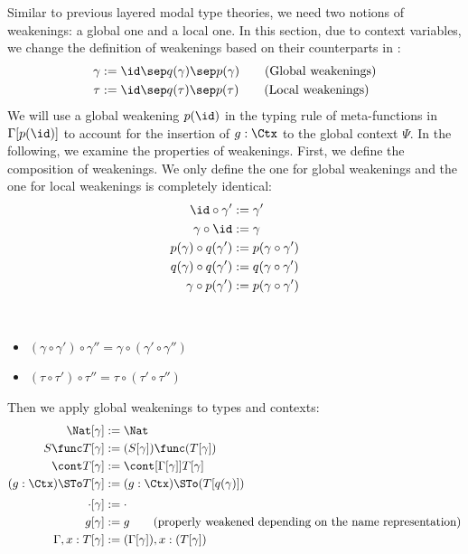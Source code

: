 Similar to previous layered modal type theories, we need two notions of weakenings: a global one and
a local one. %
In this section, due to context variables, we change the definition of weakenings
based on their counterparts in \citet{hu2024layered}:
\begin{align*}
  \gamma &:= \id \sep q(\gamma) \sep p(\gamma)
  \tag{Global weakenings}
  \\
  \tau &:= \id \sep q(\tau) \sep p(\tau)
  \tag{Local weakenings}
\end{align*}
We will use a global weakening $p(\id)$ in the typing rule of meta-functions in
$\Gamma[p(\id)]$ to account for the insertion of $g: \Ctx$ to the global context
$\Psi$. %
In the following, we examine the properties of weakenings. %
First, we define the composition of weakenings. %
We only define the one for global weakenings and the one for local weakenings is
completely identical:
\begin{align*}
  \id \circ \gamma' &:= \gamma' \\
  \gamma \circ \id &:= \gamma \\
  p(\gamma) \circ q(\gamma') &:= p(\gamma \circ \gamma') \\
  q(\gamma) \circ q(\gamma') &:= q(\gamma \circ \gamma') \\
  \gamma \circ p(\gamma') &:= p(\gamma \circ \gamma')
\end{align*}
\begin{lemma}[Associativity] $ $
  \begin{itemize}
  \item $(\gamma \circ \gamma') \circ \gamma'' = \gamma \circ (\gamma' \circ \gamma'')$
  \item $(\tau \circ \tau') \circ \tau'' = \tau \circ (\tau' \circ \tau'')$
  \end{itemize}
\end{lemma}
Then we apply global weakenings to types and contexts:
\begin{align*}
  \Nat[\gamma] &:= \Nat \\
  S \func T[\gamma] &:= (S[\gamma]) \func (T[\gamma]) \\
  \cont T [\gamma] &:= \cont[\Gamma[\gamma]]{T[\gamma]} \\
  (g: \Ctx) \STo T[\gamma] &:= (g: \Ctx) \STo (T[q(\gamma)]) \\[0.25em]
  \cdot[\gamma] &:= \cdot \\
  g[\gamma] &:= g
                 \tag{properly weakened depending on the name representation} \\
  \Gamma, x : T[\gamma] &:= (\Gamma[\gamma]), x : (T[\gamma])
\end{align*}
